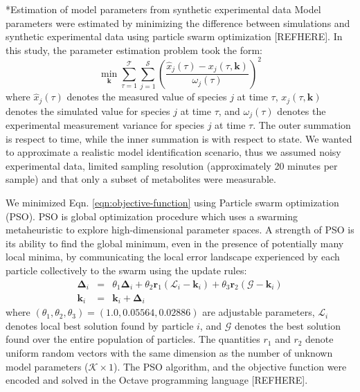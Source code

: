 \documentclass[12pt]{article}
\makeatletter
\renewcommand\subsection{\@startsection
	{subsection}{2}{0mm}
	{-0.05in}
	{-0.5\baselineskip}
	{\normalfont\normalsize\bfseries}}
\makeatother
\begin{document}
\subsection*{Estimation of model parameters from synthetic experimental data}
Model parameters were estimated by minimizing the difference between simulations and synthetic experimental data using particle swarm optimization [REFHERE].
In this study, the parameter estimation problem took the form:
\begin{equation}\label{eqn:objective-function}
	\min_{\mathbf{k}} \sum_{\tau=1}^{\mathcal{T}}\sum_{j=1}^{\mathcal{S}}\left(\frac{\hat{x}_{j}\left(\tau\right) - x_{j}\left(\tau,\mathbf{k}\right)}{\omega_{j}\left(\tau\right)}\right)^{2}
\end{equation}where $\hat{x}_{j}\left(\tau\right)$ denotes the measured value of species $j$ at time $\tau$, $x_{j}\left(\tau,\mathbf{k}\right)$ denotes the simulated 
value for species $j$ at time $\tau$, and $\omega_{j}\left(\tau\right)$ denotes the experimental measurement variance for species $j$ at time $\tau$. The outer summation is respect to
time, while the inner summation is with respect to state. We wanted to approximate a realistic model identification scenario, thus we assumed noisy experimental data, 
limited sampling resolution (approximately 20 minutes per sample) and that only a subset of metabolites were measurable. 

We minimized Eqn. \eqref{eqn:objective-function} using Particle swarm optimization (PSO).
PSO is global optimization procedure which uses a swarming metaheuristic to explore high-dimensional parameter spaces. 
A strength of PSO is its ability to find the global minimum, even in the presence of potentially many local minima, by communicating the local
error landscape experienced by each particle collectively to the swarm using the update rules:
\begin{eqnarray}
	\mathbf{\Delta}_{i} &=&\theta_{1}\mathbf{\Delta}_{i} + \theta_{2}\mathbf{r}_{1}\left(\mathcal{L}_{i} - \mathbf{k}_{i}\right) + \theta_{3}\mathbf{r}_{2}\left(\mathcal{G} - \mathbf{k}_{i}\right) \\
	\mathbf{k}_{i} &=& \mathbf{k}_{i} + \mathbf{\Delta}_{i}
\end{eqnarray}where $\left(\theta_{1},\theta_{2},\theta_{3}\right) = (1.0,0.05564,0.02886)$ are adjustable parameters, $\mathcal{L}_{i}$ denotes local best solution found by particle $i$, and
$\mathcal{G}$ denotes the best solution found over the entire population of particles. The quantities $r_{1}$ and $r_{2}$ denote uniform random vectors with the same dimension as the number of unknown model
parameters ($\mathcal{K}\times{1}$). The PSO algorithm, and the objective function were encoded and solved in the Octave programming language [REFHERE].
\end{document}
